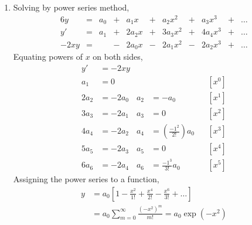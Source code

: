 \begin{enumerate}
    \item Solving by power series method,
          \begin{alignat}{6}
              y     & ={}      & a_0   & {}+{}    & a_1 x  &
              {}+{} & a_2 x^2  & {}+{} & a_3x^3   & {}+{}  & \dots \\
              y'    & ={}      & a_1   & {}+{}    & 2a_2 x &
              {}+{} & 3a_3 x^2 & {}+{} & 4a_4 x^3 & {}+{}  & \dots \\
              -2xy  & ={}      &       & {}-{}    & 2a_0 x &
              {}-{} & 2a_1 x^2 & {}-{} & 2a_2 x^3 & {}+{}  & \dots
          \end{alignat}
          Equating powers of $ x $ on both sides,
          \begin{align}
              y'   & = -2xy                                           \\
              a_1  & = 0                                  &
                   &                                      &   & [x^0] \\
              2a_2 & = -2a_0                              &
              a_2  & = -a_0                               &   & [x^1] \\
              3a_3 & = -2a_1                              &
              a_3  & = 0                                  &   & [x^2] \\
              4a_4 & = -2a_2                              &
              a_4  & = \left( \frac{-1^2}{2!} \right) a_0 &   & [x^3] \\
              5a_5 & = -2a_3                              &
              a_5  & = 0                                  &   & [x^4] \\
              6a_6 & = -2a_4                              &
              a_6  & = \frac{-1^3}{3!}a_0                 &   & [x^5]
          \end{align}
          Assigning the power series to a function,
          \begin{align}
              y & = a_0 \left[1 - \frac{x^2}{1!} + \frac{x^4}{2!}
              - \frac{x^6}{3!} + \dots \right]                    \\
                & = a_0 \sum_{m = 0}^{\infty}
              \frac{\left( -x^2 \right)^m}{m!} = a_0\exp(-x^2)
          \end{align}


\end{enumerate}
